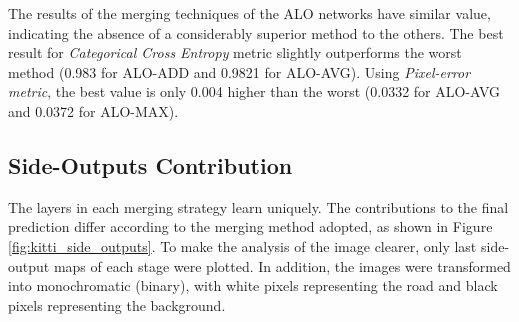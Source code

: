 % 

The results of the merging techniques of the ALO networks have similar value, indicating the absence of a considerably superior method to the others.
The best result for \textit{Categorical Cross Entropy} metric slightly outperforms the worst method (0.983 for ALO-ADD and 0.9821 for ALO-AVG).
Using \textit{Pixel-error metric}, the best value is only 0.004 higher than the worst (0.0332 for ALO-AVG and 0.0372 for ALO-MAX).

\subsection{Side-Outputs Contribution}
\label{cap6_contribuicoes_saidas_intermediarias}

The layers in each merging strategy learn uniquely.
The contributions to the final prediction differ according to the merging method adopted, as shown in Figure \ref{fig:kitti_side_outputs}.
To make the analysis of the image clearer, only last side-output maps of each stage were plotted.
In addition, the images were transformed into monochromatic (binary), with white pixels representing the road and black pixels representing the background.


